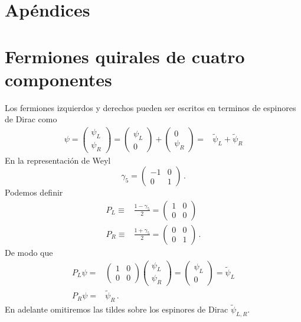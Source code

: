 \section{Apéndices}


\section{Fermiones quirales de cuatro componentes}
\label{sec:ferm-quir-de}

Los fermiones izquierdos y derechos pueden ser escritos en terminos de espinores de Dirac como
\begin{align}
  \psi=\begin{pmatrix}
    \psi_L\\
    \psi_R
  \end{pmatrix}=
  \begin{pmatrix}
    \psi_L\\
    0    
  \end{pmatrix}+
  \begin{pmatrix}
    0\\
    \psi_R    
  \end{pmatrix}=&\widetilde{\psi}_L+\widetilde{\psi}_R
\end{align}
En la representaci\'on de Weyl
\begin{equation}
  \gamma_5=
  \begin{pmatrix}
    -1 & 0\\
    0 &1   
  \end{pmatrix}\,.
\end{equation}
Podemos definir
\begin{align}
  P_L\equiv&\frac{1-\gamma_5}{2}=
  \begin{pmatrix}
    1 & 0\\
    0 &0
  \end{pmatrix}\nonumber\\
  P_R\equiv&\frac{1+\gamma_5}{2}=
  \begin{pmatrix}
    0 & 0\\
    0 &1
  \end{pmatrix}\,.
\end{align}
De modo que
\begin{align}
  P_L\psi=&\begin{pmatrix}
    1 & 0\\
    0& 0    
  \end{pmatrix}
  \begin{pmatrix}
    \psi_L\\
    \psi_R
  \end{pmatrix}=
  \begin{pmatrix}
    \psi_L\\
    0
  \end{pmatrix}=\widetilde{\psi}_L\nonumber\\
  P_R\psi=&\widetilde{\psi}_R\,.
\end{align}
En adelante omitiremos las tildes sobre los espinores de Dirac $\widetilde{\psi}_{L,R}$.

